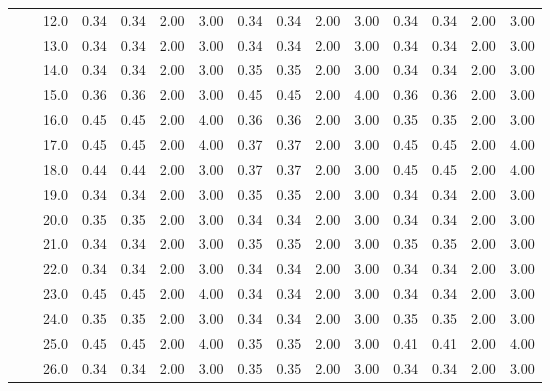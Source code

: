 \begin{tabular}{lllrrrrrrrrrrrr}
      &     & 12.0 &       0.34 &      0.34 & 2.00 &   3.00 &       0.34 &      0.34 & 2.00 &   3.00 &       0.34 &      0.34 & 2.00 &   3.00 \\
      &     & 13.0 &       0.34 &      0.34 & 2.00 &   3.00 &       0.34 &      0.34 & 2.00 &   3.00 &       0.34 &      0.34 & 2.00 &   3.00 \\
      &     & 14.0 &       0.34 &      0.34 & 2.00 &   3.00 &       0.35 &      0.35 & 2.00 &   3.00 &       0.34 &      0.34 & 2.00 &   3.00 \\
      &     & 15.0 &       0.36 &      0.36 & 2.00 &   3.00 &       0.45 &      0.45 & 2.00 &   4.00 &       0.36 &      0.36 & 2.00 &   3.00 \\
      &     & 16.0 &       0.45 &      0.45 & 2.00 &   4.00 &       0.36 &      0.36 & 2.00 &   3.00 &       0.35 &      0.35 & 2.00 &   3.00 \\
      &     & 17.0 &       0.45 &      0.45 & 2.00 &   4.00 &       0.37 &      0.37 & 2.00 &   3.00 &       0.45 &      0.45 & 2.00 &   4.00 \\
      &     & 18.0 &       0.44 &      0.44 & 2.00 &   3.00 &       0.37 &      0.37 & 2.00 &   3.00 &       0.45 &      0.45 & 2.00 &   4.00 \\
      &     & 19.0 &       0.34 &      0.34 & 2.00 &   3.00 &       0.35 &      0.35 & 2.00 &   3.00 &       0.34 &      0.34 & 2.00 &   3.00 \\
      &     & 20.0 &       0.35 &      0.35 & 2.00 &   3.00 &       0.34 &      0.34 & 2.00 &   3.00 &       0.34 &      0.34 & 2.00 &   3.00 \\
      &     & 21.0 &       0.34 &      0.34 & 2.00 &   3.00 &       0.35 &      0.35 & 2.00 &   3.00 &       0.35 &      0.35 & 2.00 &   3.00 \\
      &     & 22.0 &       0.34 &      0.34 & 2.00 &   3.00 &       0.34 &      0.34 & 2.00 &   3.00 &       0.34 &      0.34 & 2.00 &   3.00 \\
      &     & 23.0 &       0.45 &      0.45 & 2.00 &   4.00 &       0.34 &      0.34 & 2.00 &   3.00 &       0.34 &      0.34 & 2.00 &   3.00 \\
      &     & 24.0 &       0.35 &      0.35 & 2.00 &   3.00 &       0.34 &      0.34 & 2.00 &   3.00 &       0.35 &      0.35 & 2.00 &   3.00 \\
      &     & 25.0 &       0.45 &      0.45 & 2.00 &   4.00 &       0.35 &      0.35 & 2.00 &   3.00 &       0.41 &      0.41 & 2.00 &   4.00 \\
      &     & 26.0 &       0.34 &      0.34 & 2.00 &   3.00 &       0.35 &      0.35 & 2.00 &   3.00 &       0.34 &      0.34 & 2.00 &   3.00 \\

\end{tabular}

